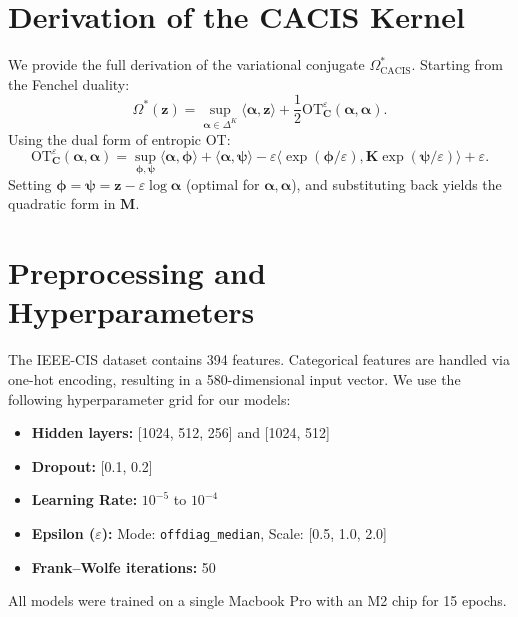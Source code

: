\documentclass[sigconf,anonymous]{acmart}
\newcommand{\vz}{\mathbf{z}}
\newcommand{\valpha}{\bm{\alpha}}
\newcommand{\vphi}{\bm{\phi}}
\newcommand{\vpsi}{\bm{\psi}}
\newcommand{\mC}{\mathbf{C}}
\newcommand{\mK}{\mathbf{K}}
\newcommand{\mM}{\mathbf{M}}
\newcommand{\OT}{\mathrm{OT}}
\begin{document}
\section{Derivation of the CACIS Kernel}
We provide the full derivation of the variational conjugate $\Omega^*_{\text{CACIS}}$. Starting from the Fenchel duality:
\begin{equation}
\Omega^*(\vz) = \sup_{\valpha \in \Delta^K} \langle \valpha, \vz \rangle + \frac{1}{2} \OT^{\varepsilon}_{\mC}(\valpha, \valpha).
\end{equation}
Using the dual form of entropic OT:
\begin{equation}
\OT^{\varepsilon}_{\mC}(\valpha, \valpha) = \sup_{\vphi, \vpsi} \langle \valpha, \vphi \rangle + \langle \valpha, \vpsi \rangle - \varepsilon \langle \exp(\vphi/\varepsilon), \mK \exp(\vpsi/\varepsilon) \rangle + \varepsilon.
\end{equation}
Setting $\vphi = \vpsi = \vz - \varepsilon \log \valpha$ (optimal for $\valpha, \valpha$), and substituting back yields the quadratic form in $\mM$.

\section{Preprocessing and Hyperparameters}
The IEEE-CIS dataset contains 394 features. Categorical features are handled via one-hot encoding, resulting in a 580-dimensional input vector. We use the following hyperparameter grid for our models:
\begin{itemize}
    \item \textbf{Hidden layers:} [1024, 512, 256] and [1024, 512]
    \item \textbf{Dropout:} [0.1, 0.2]
    \item \textbf{Learning Rate:} $10^{-5}$ to $10^{-4}$
    \item \textbf{Epsilon ($\varepsilon$):} Mode: \texttt{offdiag\_median}, Scale: [0.5, 1.0, 2.0]
    \item \textbf{Frank--Wolfe iterations:} 50
\end{itemize}
All models were trained on a single Macbook Pro with an M2 chip for 15 epochs.



\end{document}
